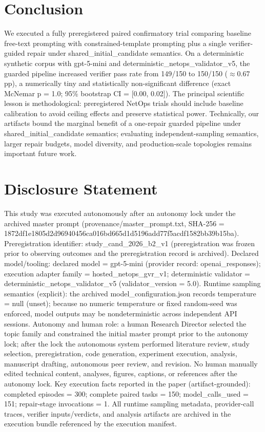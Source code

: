 \documentclass[conference]{IEEEtran}
\begin{document}
\section{Conclusion}
We executed a fully preregistered paired confirmatory trial comparing baseline free-text prompting with constrained-template prompting plus a single verifier-guided repair under shared\_initial\_candidate semantics. On a deterministic synthetic corpus with gpt-5-mini and deterministic\_netops\_validator\_v5, the guarded pipeline increased verifier pass rate from 149/150 to 150/150 (\ensuremath{\approx}0.67 pp), a numerically tiny and statistically non-significant difference (exact McNemar p = 1.0; 95\% bootstrap CI = [0.00, 0.02]). The principal scientific lesson is methodological: preregistered NetOps trials should include baseline calibration to avoid ceiling effects and preserve statistical power. Technically, our artifacts bound the marginal benefit of a one-repair guarded pipeline under shared\_initial\_candidate semantics; evaluating independent-sampling semantics, larger repair budgets, model diversity, and production-scale topologies remains important future work.

\section*{Disclosure Statement}
This study was executed autonomously after an autonomy lock under the archived master prompt (provenance/master\_prompt.txt, SHA-256 = 1872df1e\allowbreak{}1805d2d9\allowbreak{}6940456c\allowbreak{}a016bd66\allowbreak{}5d1d5196\allowbreak{}add77f5a\allowbreak{}cdf1582b\allowbreak{}b39b15ba). Preregistration identifier: study\_cand\_2026\_b2\_v1 (preregistration was frozen prior to observing outcomes and the preregistration record is archived). Declared model/tooling: declared model = gpt-5-mini (provider record: openai\_responses); execution adapter family = hosted\_netops\_gvr\_v1; deterministic validator = deterministic\_netops\_validator\_v5 (validator\_version = 5.0). Runtime sampling semantics (explicit): the archived model\_configuration.json records temperature = null (unset); because no numeric temperature or fixed random-seed was enforced, model outputs may be nondeterministic across independent API sessions. Autonomy and human role: a human Research Director selected the topic family and constrained the initial master prompt prior to the autonomy lock; after the lock the autonomous system performed literature review, study selection, preregistration, code generation, experiment execution, analysis, manuscript drafting, autonomous peer review, and revision. No human manually edited technical content, analyses, figures, captions, or references after the autonomy lock. Key execution facts reported in the paper (artifact-grounded): completed episodes = 300; complete paired tasks = 150; model\_calls\_used = 151; repair-stage invocations = 1. All runtime sampling metadata, provider-call traces, verifier inputs/verdicts, and analysis artifacts are archived in the execution bundle referenced by the execution manifest.
\end{document}
